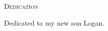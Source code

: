 \begin{center}\textsc{Dedication}\end{center}

\vspace*{\fill}
\hspace*{\fill}
Dedicated to my new son Logan.
\hspace*{\fill}
\vspace*{\fill}

